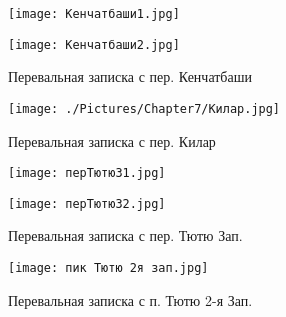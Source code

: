    \begin{figure}[ht]\label{fig:pass_notes_kenchatbashi}
        \begin{center}
            \begin{minipage}[h]{0.5\linewidth}
                \texttt{[image: Кенчатбаши1.jpg]}
            \end{minipage}%
            \begin{minipage}[h]{0.5\linewidth}
                \texttt{[image: Кенчатбаши2.jpg]}
            \end{minipage}
        \end{center}
        \caption{Перевальная записка с пер. Кенчатбаши}
    \end{figure}

    \begin{figure}[ht]\label{fig:pass_notes_kilar}
        \centering
        \texttt{[image: ./Pictures/Chapter7/Килар.jpg]}
        \caption{Перевальная записка с пер. Килар}
    \end{figure}

    \begin{figure}[ht]\label{fig:pass_notes_tutu}
        \begin{center}
            \begin{minipage}[h]{0.5\linewidth}
                \texttt{[image: перТютюЗ1.jpg]}
            \end{minipage}%
            \begin{minipage}[h]{0.5\linewidth}
                \texttt{[image: перТютюЗ2.jpg]}
            \end{minipage}
        \end{center}
        \caption{Перевальная записка с пер. Тютю Зап.}
    \end{figure}

    \begin{figure}[ht]\label{fig:pass_notes_tutu2}
        \centering
        \texttt{[image: пик Тютю 2я зап.jpg]}
        \caption{Перевальная записка с п. Тютю 2-я Зап.}
    \end{figure}

